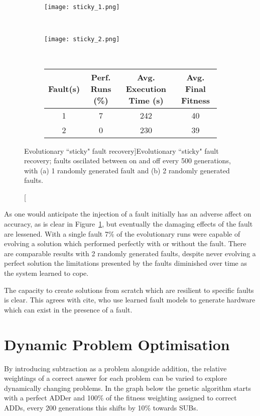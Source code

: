 \begin{figure}
	\centering
	\begin{subfigure}[ht]{0.49\textwidth}
		\texttt{[image: sticky\_1.png]}
		\caption{}
		\vspace{1em}
	\end{subfigure}
	~
	\begin{subfigure}[ht]{0.49\textwidth}
		\texttt{[image: sticky\_2.png]}
		\caption{}
		\vspace{1em}
	\end{subfigure}
	~
	\begin{subfigure}[ht]{\textwidth}
		\centering
		\begin{tabular}{cccc}
			\toprule
			\bfseries{Fault(s)} & \bfseries{Perf. Runs (\%)} &
			\bfseries{Avg. Execution Time (s)} & \bfseries{Avg. Final Fitness}\\
			\midrule
			1 & 7 & 242 & 40 \\
			2 & 0 & 230 & 39 \\
			\bottomrule
		\end{tabular}
	\end{subfigure}
	\caption[Evolutionary ``sticky" fault recovery]{Evolutionary ``sticky"
		fault recovery; faults oscilated between on and off every 500
		generations, with
		(a) 1 randomly generated fault and (b) 2 randomly generated
	faults.}
	\label{fig:sticky}
\end{figure}

As one would anticipate the injection of a fault initially has an adverse affect on
accuracy, as is clear in Figure~\ref{fig:sticky}, but eventually the damaging effects
of the fault are lessened. With a single fault 7\% of the evolutionary runs
were capable of evolving a solution which performed perfectly with or without
the fault. There are comparable results with 2 randomly generated faults, despite
never evolving a perfect solution the limitations presented by the faults diminished
over time as the system learned to cope.

The capacity to create solutions from scratch which are resilient to specific faults
is clear. This agrees with \todo cite, who use learned fault models to generate
hardware which can exist in the presence of a fault.

\section{Dynamic Problem Optimisation}
By introducing subtraction as a problem alongside addition, the relative weightings of a correct answer for each problem can be varied to explore dynamically changing problems. In the graph below the genetic algorithm starts with a perfect ADDer and 100\% of the fitness weighting assigned to correct ADDs, every 200 generations this shifts by 10\% towards SUBs.

